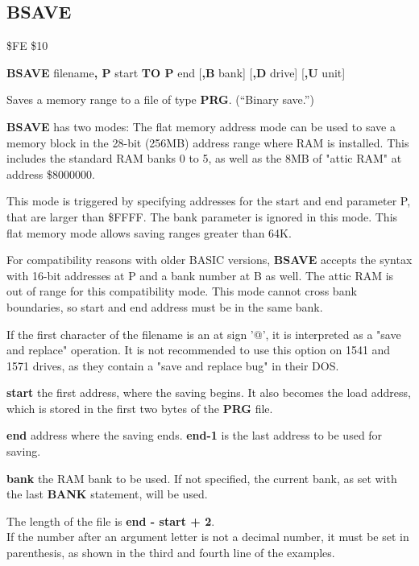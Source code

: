 \newpage
\subsection{BSAVE}
\begin{description}[leftmargin=2cm,style=nextline]
\item [Token:] \$FE \$10
\item [Format:] {\bf BSAVE} filename{\bf, P} start {\bf TO P} end
                [{\bf,B} bank] [{\bf,D} drive] [{\bf,U} unit]
\item [Usage:]
   Saves a memory range to a file of type {\bf PRG}. (``Binary save.'')

   {\bf BSAVE} has two modes:
   The flat memory address mode can be used to save a memory block
   in the 28-bit (256MB) address range where RAM is installed.
   This includes the standard RAM banks 0 to 5, as well as
   the 8MB of "attic RAM" at address \$8000000.

   This mode is triggered by specifying addresses for the start
   and end parameter P, that are
   larger than \$FFFF. The bank parameter is ignored in this mode.
   This flat memory mode allows saving ranges greater than 64K.

   For compatibility reasons with older BASIC versions, {\bf BSAVE}
   accepts the syntax with 16-bit addresses at P and a bank number at B as well.
   The attic RAM is out of range for this compatibility mode.
   This mode cannot cross bank boundaries, so start and end address
   must be in the same bank.


   \filenamedefinition
   If the first character of the filename is an at sign '@', it
   is interpreted as a "save and replace" operation. It is not recommended
   to use this option on 1541 and 1571 drives, as they
   contain a "save and replace bug" in their DOS.

    {\bf start} the first address, where the saving begins.
    It also becomes the load address,
    which is stored in the first two bytes of the {\bf PRG} file.

   {\bf end} address where the saving ends.
   {\bf end-1} is the last address to be used for saving.

   {\bf bank} the RAM bank to be used.
   If not specified, the current bank, as set with the last
   {\bf BANK} statement, will be used.

   \drivedefinition

   \unitdefinition

\item [Remarks:]
   The length of the file is {\bf end - start + 2}. \\
   If the number after an argument letter is not a decimal
   number, it must be set in parenthesis, as shown
   in the third and fourth line of the examples.


\end{description}
